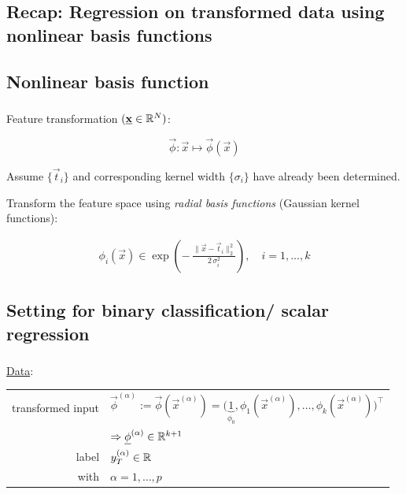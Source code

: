 \subsection{Recap: Regression on transformed data using nonlinear basis functions}


\subsection{Nonlinear basis function}


\begin{frame}\frametitle{\subsecname}

Feature transformation $(\underline{\mathbf{x}}\in \mathbb{R}^N)$:

\begin{equation}
\vec \phi: \vec x \mapsto \vec \phi(\vec x)
\end{equation}


Assume $\{\vec t_i\}$ and corresponding kernel width $\{\sigma_i\}$ have already been determined.

Transform the feature space using \emph{radial basis functions} (Gaussian kernel functions):

\begin{align}
\phi_i(\vec x) \in 
\exp\left( -\,\frac{\lVert \vec x - \vec t_i\rVert^2_2}{2\,\sigma_{i}^2} \right), \quad i=1,\ldots,k
\end{align}

\end{frame}

\subsection{Setting for binary classification/ scalar regression}

\begin{frame}\frametitle{\subsecname}

\underline{Data}:\\

\begin{table}[h]
\begin{tabular}{rl}
transformed input & $\vec \phi^{(\alpha)} := \vec \phi(\vec x^{(\alpha)}) = \big ( 
\underbrace{1}_{\phi_{0}},
\phi_{1}(\vec x^{(\alpha)}), \ldots, \phi_{k}(\vec x^{(\alpha)}) \big)^{\top}$\\
&$\Rightarrow \underline{\mathbf{\phi}}^{(\alpha)} \in \mathbb{R}^{k+1}$ \\[2mm]
label         & $y_{T}^{(\alpha)} \in \mathbb{R}$ \\
with & $\alpha = 1,\ldots,p$
\end{tabular}
\end{table}

\end{frame}

